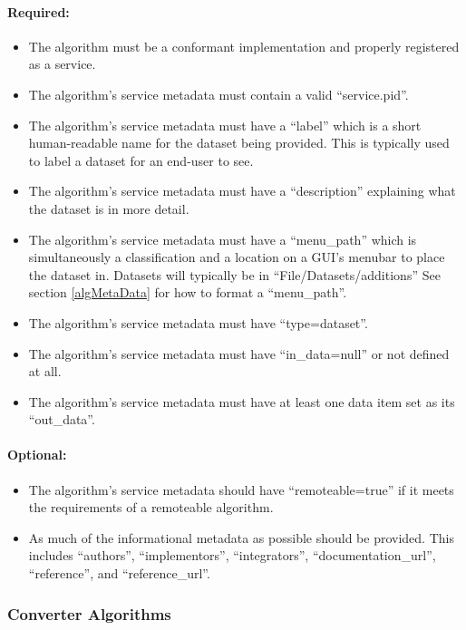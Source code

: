 \paragraph*{Required:}
\begin{itemize}
  \item The algorithm must be a conformant 
  implementation and properly registered as a service.
  \item The algorithm's service metadata must contain a valid ``service.pid''.
  \item The algorithm's service metadata must have a ``label'' which is a
  short human-readable name for the dataset being provided. This is typically
  used to label a dataset for an end-user to see.
  \item The algorithm's service metadata must have a ``description''
  explaining what the dataset is in more detail.
  \item The algorithm's service metadata must have a ``menu\_path'' which is
  simultaneously a classification and a location on a GUI's menubar to place
  the dataset in. Datasets will typically be in ``File/Datasets/additions''
  See section \ref{algMetaData} for how to format a ``menu\_path''.
  \item The algorithm's service metadata must have ``type=dataset''.
  \item The algorithm's service metadata must have ``in\_data=null'' or
  not defined at all.
  \item The algorithm's service metadata must have at least one data item set
  as its ``out\_data''.
\end{itemize}

\paragraph*{Optional:}
\begin{itemize}
  \item The algorithm's service metadata should have ``remoteable=true'' if it
  meets the requirements of a remoteable algorithm.
  \item As much of the informational metadata as possible should be
  provided. This includes ``authors'', ``implementors'', ``integrators'',
  ``documentation\_url'', ``reference'', and ``reference\_url''.
\end{itemize}

\subsubsection{Converter Algorithms}
\label{converterAlg}

